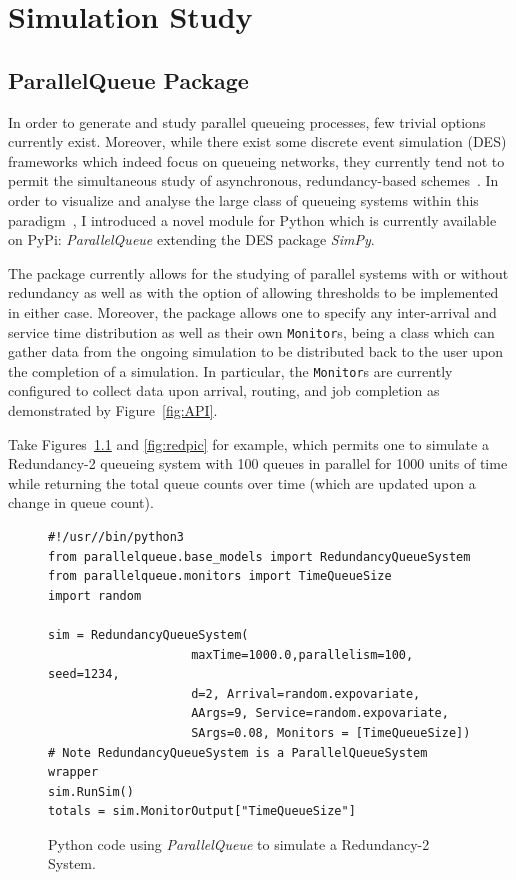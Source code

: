 \chapter{Simulation Study}\label{ch:simulation-study}


\section{ParallelQueue Package}\label{sec:parallelqueue-package}
In order to generate and study parallel queueing processes, few trivial options currently exist.
Moreover, while there exist some discrete event simulation (DES) frameworks which indeed focus on queueing networks, they currently tend not to permit the simultaneous study of asynchronous, redundancy-based schemes~\cite{noauthor_ciwpythonciw_nodate}.
In order to visualize and analyse the large class of queueing systems within this paradigm~\cite{shneer_large-scale_2020,cruise_stability_2020}, I introduced a novel module for Python which is currently available on PyPi: \textit{ParallelQueue} extending the DES package \textit{SimPy}.

The package currently allows for the studying of parallel systems with or without redundancy as well as with the option of allowing thresholds to be implemented in either case.
Moreover, the package allows one to specify any inter-arrival and service time distribution as well as their own \lstinline{Monitor}s, being a class which can gather data from the ongoing simulation to be distributed back to the user upon the completion of a simulation.
In particular, the \lstinline{Monitor}s are currently configured to collect data upon arrival, routing, and job completion as demonstrated by Figure~\ref{fig:API}.

Take Figures~\ref{fig:red} and \ref{fig:redpic} for example, which permits one to simulate a Redundancy-2 queueing system with 100 queues in parallel for 1000 units of time while returning the total queue counts over time (which are updated upon a change in queue count).

\begin{figure}

    \begin{lstlisting}[label={lst:lstlisting}]
#!/usr//bin/python3
from parallelqueue.base_models import RedundancyQueueSystem
from parallelqueue.monitors import TimeQueueSize
import random

sim = RedundancyQueueSystem(
                    maxTime=1000.0,parallelism=100, seed=1234,
                    d=2, Arrival=random.expovariate,
                    AArgs=9, Service=random.expovariate,
                    SArgs=0.08, Monitors = [TimeQueueSize])
# Note RedundancyQueueSystem is a ParallelQueueSystem wrapper
sim.RunSim()
totals = sim.MonitorOutput["TimeQueueSize"]
    \end{lstlisting}
    \caption{Python code using \textit{ParallelQueue} to simulate a Redundancy-2 System.}
    \label{fig:red}
\end{figure}

